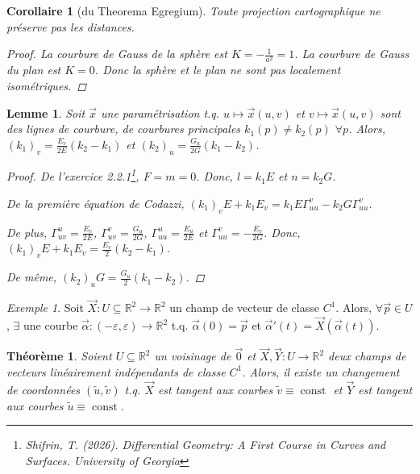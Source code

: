 \documentclass{report}
\newtheorem*{thm}{Th\'eor\`eme}
\newtheorem*{lem}{Lemme}
\newtheorem*{coro}{Corollaire}
\theoremstyle{definition}
\theoremstyle{remark}
\newtheorem*{exem}{Exemple}
\def\RR{\mathbb{R}}
\begin{document}
	\begin{coro}[du Theorema Egregium]
		Toute projection cartographique ne pr\'eserve pas les distances.
		\begin{proof}
			La courbure de Gauss de la sph\`ere est $K=-\frac{1}{a^2}=1$. La courbure de Gauss du plan est $K=0$. Donc la sph\`ere et le plan ne sont pas localement isom\'etriques.
		\end{proof}
	\end{coro}

	\begin{lem}
		Soit $\vec x$ une param\'etrisation t.q. $u\mapsto\vec x(u,v)$ et $v\mapsto\vec x(u,v)$ sont des lignes de courbure, de courbures principales $k_1(p)\neq k_2(p)$ $\forall p$. Alors, $(k_1)_v=\frac{E_v}{2E}(k_2-k_1)$ et $(k_2)_u=\frac{G_u}{2G}(k_1-k_2)$.
		\begin{proof}
			De l'exercice 2.2.1\footnote{Shifrin, T. (2026). \textit{Differential Geometry: A First Course in Curves and Surfaces}. University of Georgia}, $F=m=0$. Donc, $l=k_1E$ et $n=k_2G$.

			De la premi\`ere \'equation de Codazzi, $(k_1)_vE+k_1E_v=k_1E\Gamma_{uu}^v-k_2G\Gamma_{uu}^v$.

			De plus, $\Gamma_{uv}^u=\frac{E_v}{2E}$, $\Gamma_{uv}^v=\frac{G_u}{2G}$, $\Gamma_{uu}^u=\frac{E_u}{2E}$ et $\Gamma_{uu}^v=-\frac{E_v}{2G}$. Donc, $(k_1)_vE+k_1E_v = \frac{E_v}{2}(k_2-k_1)$.

			De m\^eme, $(k_2)_uG=\frac{G_u}{2}(k_1-k_2)$.
		\end{proof}
	\end{lem}

	\begin{exem}
		Soit $\vec X:U\subseteq\RR^2\to\RR^2$ un champ de vecteur de classe $C^1$. Alors, $\forall\vec p\in U$, $\exists$ une courbe $\vec\alpha:(-\varepsilon,\varepsilon)\to\RR^2$ t.q. $\vec\alpha(0)=\vec p$ et $\vec\alpha'(t)=\vec X(\vec\alpha(t))$.
	\end{exem}

	\begin{thm}
		Soient $U\subseteq\RR^2$ un voisinage de $\vec0$ et $\vec X,\vec Y:U\to\RR^2$ deux champs de vecteurs lin\'eairement ind\'ependants de classe $C^1$. Alors, il existe un changement de coordonn\'ees $(\widetilde{u},\widetilde{v})$ t.q. $\vec X$ est tangent aux courbes $\widetilde{v}\equiv\operatorname{const}$ et $\vec Y$ est tangent aux courbes $\widetilde{u}\equiv\operatorname{const}$.
	\end{thm}
\end{document}
